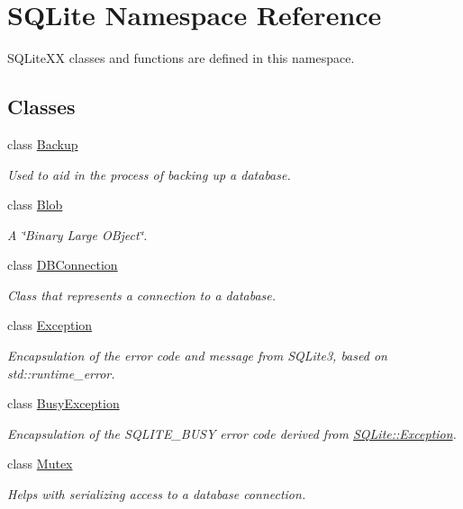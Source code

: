 \hypertarget{a00038}{\section{S\-Q\-Lite Namespace Reference}
\label{a00038}
}


S\-Q\-Lite\-X\-X classes and functions are defined in this namespace.  


\subsection*{Classes}
\begin{DoxyCompactItemize}
\item 
class \hyperlink{a00001}{Backup}
\begin{DoxyCompactList}\small\item\em Used to aid in the process of backing up a database. \end{DoxyCompactList}\item 
class \hyperlink{a00002}{Blob}
\begin{DoxyCompactList}\small\item\em A \char`\"{}\-Binary Large O\-Bject\char`\"{}. \end{DoxyCompactList}\item 
class \hyperlink{a00004}{D\-B\-Connection}
\begin{DoxyCompactList}\small\item\em Class that represents a connection to a database. \end{DoxyCompactList}\item 
class \hyperlink{a00006}{Exception}
\begin{DoxyCompactList}\small\item\em Encapsulation of the error code and message from S\-Q\-Lite3, based on std\-::runtime\-\_\-error. \end{DoxyCompactList}\item 
class \hyperlink{a00003}{Busy\-Exception}
\begin{DoxyCompactList}\small\item\em Encapsulation of the S\-Q\-L\-I\-T\-E\-\_\-\-B\-U\-S\-Y error code derived from \hyperlink{a00006}{S\-Q\-Lite\-::\-Exception}. \end{DoxyCompactList}\item 
class \hyperlink{a00009}{Mutex}
\begin{DoxyCompactList}\small\item\em Helps with serializing access to a database connection. \end{DoxyCompactList}\item 

\end{DoxyCompactItemize}
